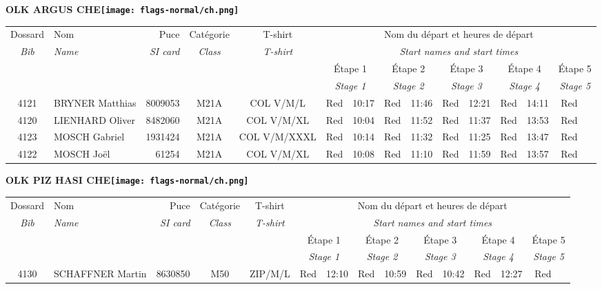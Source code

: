 \documentclass{report}
\begin{document}
\newpage
  \Huge \centering \bfseries OLK ARGUS  CHE\normalfont \footnotesize \sffamily \hfill \texttt{[image: flags-normal/ch.png]} \newline 
  \begin{longtable}{|c|l|r|c|c|*{5}{cc|}}
    Dossard & Nom  & Puce    & Catégorie & T-shirt & \multicolumn{10}{c|}{Nom du départ et heures de départ} \\
    \itshape Bib     & \itshape Name & \itshape SI card & \itshape Class  & \itshape  T-shirt  & \multicolumn{10}{c|}{\itshape Start names and start times} \\
    \hline
    & & & & & \multicolumn{2}{c|}{Étape 1} & \multicolumn{2}{c|}{Étape 2} & \multicolumn{2}{c|}{Étape 3} & \multicolumn{2}{c|}{Étape 4} & \multicolumn{2}{c|}{Étape 5} \\
    & & & & & \multicolumn{2}{c|}{\itshape Stage 1} & \multicolumn{2}{c|}{\itshape Stage 2} & \multicolumn{2}{c|}{\itshape Stage 3} & \multicolumn{2}{c|}{\itshape Stage 4} & \multicolumn{2}{c|}{\itshape Stage 5} \\
    \hline
    4121 & BRYNER Matthias & 8009053 & M21A & COL V/M/L & Red & 10:17 & Red & 11:46 & Red & 12:21 & Red & 14:11 & Red &  \\
    4120 & LIENHARD Oliver & 8482060 & M21A & COL V/M/XL & Red & 10:04 & Red & 11:52 & Red & 11:37 & Red & 13:53 & Red &  \\
    4123 & MOSCH Gabriel & 1931424 & M21A & COL V/M/XXXL & Red & 10:14 & Red & 11:32 & Red & 11:25 & Red & 13:47 & Red &  \\
    4122 & MOSCH Joël & 61254 & M21A & COL V/M/XL & Red & 10:08 & Red & 11:10 & Red & 11:59 & Red & 13:57 & Red &  \\
  \end{longtable}
\newpage
  \Huge \centering \bfseries OLK PIZ HASI  CHE\normalfont \footnotesize \sffamily \hfill \texttt{[image: flags-normal/ch.png]} \newline 
  \begin{longtable}{|c|l|r|c|c|*{5}{cc|}}
    Dossard & Nom  & Puce    & Catégorie & T-shirt & \multicolumn{10}{c|}{Nom du départ et heures de départ} \\
    \itshape Bib     & \itshape Name & \itshape SI card & \itshape Class  & \itshape  T-shirt  & \multicolumn{10}{c|}{\itshape Start names and start times} \\
    \hline
    & & & & & \multicolumn{2}{c|}{Étape 1} & \multicolumn{2}{c|}{Étape 2} & \multicolumn{2}{c|}{Étape 3} & \multicolumn{2}{c|}{Étape 4} & \multicolumn{2}{c|}{Étape 5} \\
    & & & & & \multicolumn{2}{c|}{\itshape Stage 1} & \multicolumn{2}{c|}{\itshape Stage 2} & \multicolumn{2}{c|}{\itshape Stage 3} & \multicolumn{2}{c|}{\itshape Stage 4} & \multicolumn{2}{c|}{\itshape Stage 5} \\
    \hline
    4130 & SCHAFFNER Martin & 8630850 & M50 & ZIP/M/L & Red & 12:10 & Red & 10:59 & Red & 10:42 & Red & 12:27 & Red &  \\
  \end{longtable}
\end{document}
